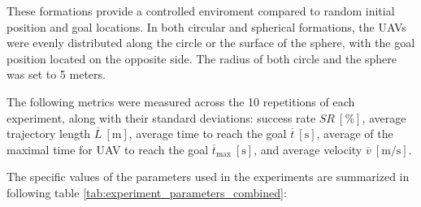         These formations provide a controlled enviroment compared to random initial position and goal locations. 
        In both circular and spherical formations, the \ac{UAV}s were evenly distributed along the circle or the surface of the sphere, with the goal position located on the opposite side.
        The radius of both circle and the sphere was set to 5 meters.
        
        The following metrics were measured across the 10 repetitions of each experiment, along with their standard deviations: success rate \( SR \ [\%] \), average trajectory length \( \overline{L} \ [\mathrm{m}] \), 
        average time to reach the goal \( \overline{t} \ [\mathrm{s}] \), average of the maximal time for \ac{UAV} to reach the goal \( \overline{t}_{\text{max}} \ [\mathrm{s}] \), and average velocity \( \overline{v} \ [\mathrm{m/s}] \).

        The specific values of the parameters used in the experiments are summarized in following table \ref{tab:experiment_parameters_combined}:


